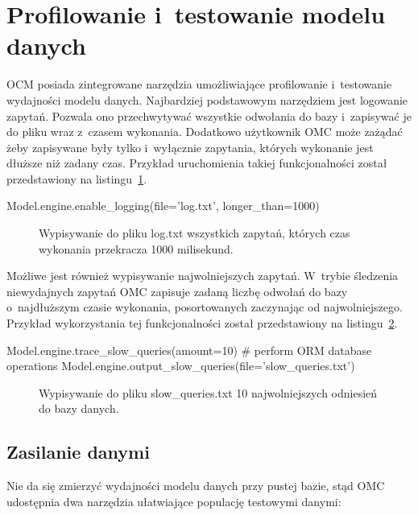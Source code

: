 \section{Profilowanie i~testowanie modelu danych}
\label{sec:ocm_profiling}

OCM posiada zintegrowane narzędzia umożliwiające profilowanie i~testowanie wydajności modelu danych. Najbardziej podstawowym narzędziem jest logowanie zapytań. Pozwala ono przechwytywać wszystkie odwołania do bazy i~zapisywać je do pliku wraz z~czasem wykonania. Dodatkowo użytkownik OMC może zażądać żeby zapisywane były tylko i~wyłącznie zapytania, których wykonanie jest dłuższe niż zadany czas. Przykład uruchomienia takiej funkcjonalności został przedstawiony na listingu~\ref{vrb:engine_logging}.

\begin{verbbox}[\footnotesize]
	Model.engine.enable_logging(file='log.txt', longer_than=1000)
\end{verbbox}

\begin{figure}[ht!]
	\centering
	\theverbbox
	\caption{Wypisywanie do pliku log.txt wszystkich zapytań, których czas wykonania przekracza 1000 milisekund.}
	\label{vrb:engine_logging}
\end{figure}

Możliwe jest również wypisywanie najwolniejszych zapytań. W~trybie śledzenia niewydajnych zapytań OMC zapisuje zadaną liczbę odwołań do bazy o~najdłuższym czasie wykonania, posortowanych zaczynając od najwolniejszego. Przykład wykorzystania tej funkcjonalności został przedstawiony na listingu~\ref{vrb:engine_slow_queries}.

\begin{verbbox}[\footnotesize]
	Model.engine.trace_slow_queries(amount=10)
	# perform ORM database operations
	Model.engine.output_slow_queries(file='slow_queries.txt')
\end{verbbox}

\begin{figure}[ht!]
	\centering
	\theverbbox
	\caption{Wypisywanie do pliku slow\_queries.txt 10 najwolniejszych odniesień do bazy danych.}
	\label{vrb:engine_slow_queries}
\end{figure}

\subsection{Zasilanie danymi}

Nie da się zmierzyć wydajności modelu danych przy pustej bazie, stąd OMC udostępnia dwa narzędzia ułatwiające populację testowymi danymi:

